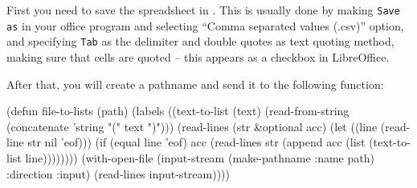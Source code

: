 \documentclass[a4paper,11pt]{article}
\begin{document}
\begin{uenum}

\item First you need to save the spreadsheet in . This is usually done by making \Verb+Save as+ in your office program and selecting ``Comma separated values (.csv)'' option, and specifying \Verb+Tab+ as the delimiter and double quotes as text quoting method, making sure that cells are quoted -- this appears as a checkbox in LibreOffice.

\item After that, you will create a pathname and send it to the following function:

\begin{lispcode}
(defun file-to-lists (path)
  (labels ((text-to-list (text)
						 (read-from-string 
						   (concatenate 'string "(" text ")")))
		   (read-lines (str &optional acc)
					   (let ((line (read-line str nil 'eof)))
						 (if (equal line 'eof)
						   acc
						   (read-lines 
							 str 
							 (append
							   acc
							   (list (text-to-list line))))))))
	(with-open-file (input-stream 
					  (make-pathname :name path)
					  :direction :input)
	  (read-lines input-stream))))
\end{lispcode}

\end{uenum}

\newpage


\end{document}
